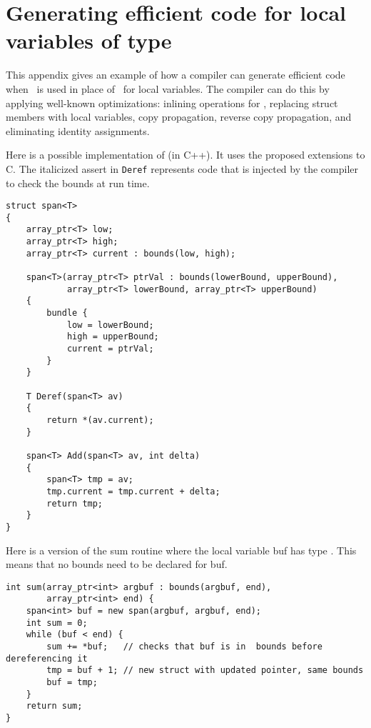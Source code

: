 
\chapter{Generating efficient code for local variables of type \spanptr}

This appendix gives an example of how a compiler can generate efficient
code when \spanptr\ is used in place of \arrayptr\
for local variables. The compiler can do this by applying well-known
optimizations: inlining operations for \spanptr , replacing
struct members with local variables, copy propagation, reverse copy
propagation, and eliminating identity assignments.

Here is a possible implementation of \spanptrT (in C++). It
uses the proposed extensions to C. The italicized assert in
\texttt{Deref} represents code that is injected by the compiler to check
the bounds at run time.

\begin{lstlisting}
struct span<T>
{
    array_ptr<T> low;
    array_ptr<T> high;
    array_ptr<T> current : bounds(low, high);
      
    span<T>(array_ptr<T> ptrVal : bounds(lowerBound, upperBound),
            array_ptr<T> lowerBound, array_ptr<T> upperBound)
    {
        bundle {
            low = lowerBound;
            high = upperBound;
            current = ptrVal;
        }
    }

    T Deref(span<T> av) 
    {
        return *(av.current);
    }

    span<T> Add(span<T> av, int delta) 
    {
        span<T> tmp = av;
        tmp.current = tmp.current + delta;
        return tmp;
    }
}
\end{lstlisting}

Here is a version of the sum routine where the local variable buf has
type \spanptr. This means that no bounds need to be declared
for buf.

\begin{lstlisting}
int sum(array_ptr<int> argbuf : bounds(argbuf, end), 
        array_ptr<int> end) {
    span<int> buf = new span(argbuf, argbuf, end);
    int sum = 0;
    while (buf < end) {
        sum += *buf;   // checks that buf is in  bounds before dereferencing it        
        tmp = buf + 1; // new struct with updated pointer, same bounds
        buf = tmp;
    }
    return sum;
}
\end{lstlisting}

